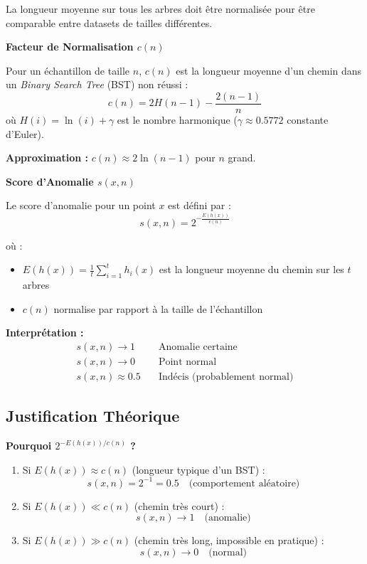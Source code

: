 \documentclass[a4paper,11pt]{article}
\begin{document}
La longueur moyenne sur tous les arbres doit être normalisée pour être comparable entre datasets de tailles différentes.

\begin{mathbox}
\textbf{Facteur de Normalisation $c(n)$}

Pour un échantillon de taille $n$, $c(n)$ est la longueur moyenne d'un chemin dans un \textit{Binary Search Tree} (BST) non réussi :
$$c(n) = 2H(n-1) - \frac{2(n-1)}{n}$$
où $H(i) = \ln(i) + \gamma$ est le nombre harmonique ($\gamma \approx 0.5772$ constante d'Euler).

\textbf{Approximation :} $c(n) \approx 2 \ln(n-1)$ pour $n$ grand.
\end{mathbox}

\begin{mathbox}
\textbf{Score d'Anomalie $s(x, n)$}

Le score d'anomalie pour un point $x$ est défini par :
$$s(x, n) = 2^{-\frac{E(h(x))}{c(n)}}$$

où :
\begin{itemize}
    \item $E(h(x)) = \frac{1}{t} \sum_{i=1}^{t} h_i(x)$ est la longueur moyenne du chemin sur les $t$ arbres
    \item $c(n)$ normalise par rapport à la taille de l'échantillon
\end{itemize}

\textbf{Interprétation :}
\begin{align*}
s(x, n) \to 1 &\quad \text{Anomalie certaine} \\
s(x, n) \to 0 &\quad \text{Point normal} \\
s(x, n) \approx 0.5 &\quad \text{Indécis (probablement normal)}
\end{align*}
\end{mathbox}

\subsection{Justification Théorique}

\begin{examplebox}
\textbf{Pourquoi $2^{-E(h(x))/c(n)}$ ?}

\begin{enumerate}
    \item Si $E(h(x)) \approx c(n)$ (longueur typique d'un BST) :
    $$s(x, n) = 2^{-1} = 0.5 \quad \text{(comportement aléatoire)}$$
    
    \item Si $E(h(x)) \ll c(n)$ (chemin très court) :
    $$s(x, n) \to 1 \quad \text{(anomalie)}$$
    
    \item Si $E(h(x)) \gg c(n)$ (chemin très long, impossible en pratique) :
    $$s(x, n) \to 0 \quad \text{(normal)}$$
\end{enumerate}
\end{examplebox}
\end{document}
